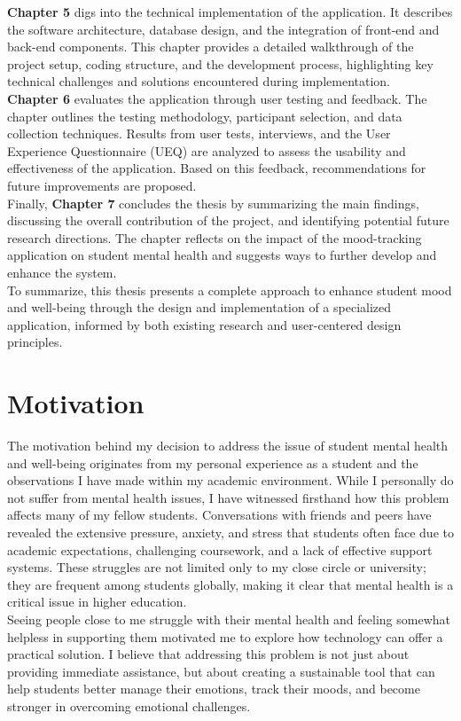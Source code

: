 \textbf{Chapter 5} digs into the technical implementation of the application. It describes the software architecture, database design, and the integration of front-end and back-end components. This chapter provides a detailed walkthrough of the project setup, coding structure, and the development process, highlighting key technical challenges and solutions encountered during implementation.\vspace{5mm} \\
\textbf{Chapter 6} evaluates the application through user testing and feedback. The chapter outlines the testing methodology, participant selection, and data collection techniques. Results from user tests, interviews, and the User Experience Questionnaire (UEQ) are analyzed to assess the usability and effectiveness of the application. Based on this feedback, recommendations for future improvements are proposed.\vspace{5mm} \\
Finally, \textbf{Chapter 7} concludes the thesis by summarizing the main findings, discussing the overall contribution of the project, and identifying potential future research directions. The chapter reflects on the impact of the mood-tracking application on student mental health and suggests ways to further develop and enhance the system.\vspace{5mm} \\
To summarize, this thesis presents a complete approach to enhance student mood and well-being through the design and implementation of a specialized application, informed by both existing research and user-centered design principles.

\section{Motivation}

The motivation behind my decision to address the issue of student mental health and well-being originates from my personal experience as a student and the observations I have made within my academic environment. While I personally do not suffer from mental health issues, I have witnessed firsthand how this problem affects many of my fellow students. Conversations with friends and peers have revealed the extensive pressure, anxiety, and stress that students often face due to academic expectations, challenging coursework, and a lack of effective support systems. These struggles are not limited only to my close circle or university; they are frequent among students globally, making it clear that mental health is a critical issue in higher education.\vspace{5mm} \\
Seeing people close to me struggle with their mental health and feeling somewhat helpless in supporting them motivated me to explore how technology can offer a practical solution. I believe that addressing this problem is not just about providing immediate assistance, but about creating a sustainable tool that can help students better manage their emotions, track their moods, and become stronger in overcoming emotional challenges.

